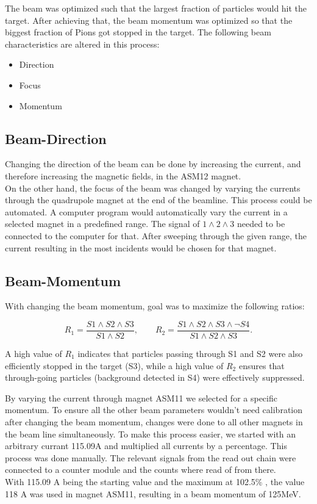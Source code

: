 \documentclass[11pt,a4paper]{article}
\begin{document}
The beam was optimized such that the largest fraction of particles would hit the target. After achieving that, the beam momentum was optimized so that the biggest fraction of Pions got stopped in the target. The following beam characteristics are altered in this process:



\begin{itemize}
\item Direction
\item Focus
\item Momentum
\end{itemize}


\subsection{Beam-Direction}
Changing the direction of the beam can be done by increasing the current, and therefore increasing the magnetic fields, in the ASM12 magnet.\\
On the other hand, the focus of the beam was changed by varying the currents through the quadrupole magnet at the end of the beamline. This process could be automated. A computer program would automatically vary the current in a selected magnet in a predefined range. The signal of $1 \land 2 \land 3 $  needed to be connected to the computer for that. After sweeping through the given range, the current resulting in the most incidents would be chosen for that magnet.\\

\subsection{Beam-Momentum}

With changing the beam momentum, goal was to maximize the following ratios:

\[
R_1 = \frac{S1 \land S2 \land S3}{S1 \land S2}, \qquad
R_2 = \frac{S1 \land S2 \land S3 \land \lnot S4}{S1 \land S2 \land S3}.
\]

A high value of $R_1$ indicates that particles passing through S1 and S2 were also efficiently stopped in the target (S3), while a high value of $R_2$ ensures that through-going particles (background detected in S4) were effectively suppressed.

By varying the current through magnet ASM11 we selected for a specific momentum. To ensure all the other beam parameters wouldn't need calibration after changing the beam momentum, changes were done to all other magnets in the beam line simultaneously. To make this process easier, we started with an arbitrary currant 115.09A and multiplied all currents by a percentage. This process was done manually. The relevant signals from the read out chain were connected to a counter module and the counts where read of from there. \\
With 115.09 A being the starting value and the maximum at 102.5\% , the value 118 A was used in magnet ASM11, resulting in a beam momentum of 125MeV.
\end{document}
